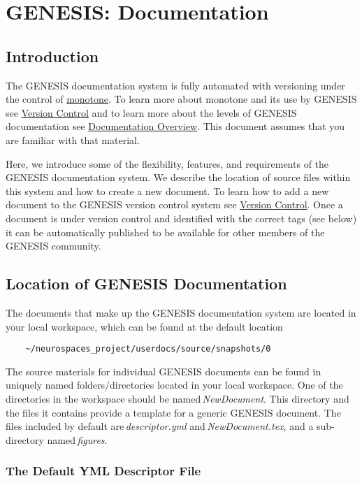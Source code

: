 \documentclass[12pt]{article}
\begin{document}
\section*{GENESIS: Documentation}

\subsection*{Introduction}

The GENESIS documentation system is fully automated with versioning under the control of \href{http://monotone.ca/}{monotone}. To learn more about monotone and its use by GENESIS see \href{../version-control/version-control.tex}{Version Control} and to learn more about the levels of GENESIS documentation see \href{../documentation-overview/documentation-overview.tex}{Documentation Overview}. This document assumes that you are familiar with that material.

Here, we introduce some of the flexibility, features, and requirements of the GENESIS documentation system. We describe the location of source files within this system and how to create a new document. To learn how to add a new document to the GENESIS version control system see \href{../version-control/version-control.tex}{Version Control}. Once a document is under version control and identified with the correct tags (see below) it can be automatically published to be available for other members of the GENESIS community.

\subsection*{Location of GENESIS Documentation}

The documents that make up the GENESIS documentation system are located in your local workspace, which can be found at the default location
\begin{verbatim}
    ~/neurospaces_project/userdocs/source/snapshots/0
\end{verbatim}
The source materials for individual GENESIS documents can be found in uniquely named folders/directories located in your local workspace. One of the directories in the workspace should be named\,{\it NewDocument}. This directory and the files it contains provide a template for a generic GENESIS document. The files included by default are\,{\it descriptor.yml} and\,{\it NewDocument.tex}, and a sub-directory named\,{\it figures}.

\subsubsection*{The Default YML Descriptor File}
\end{document}
